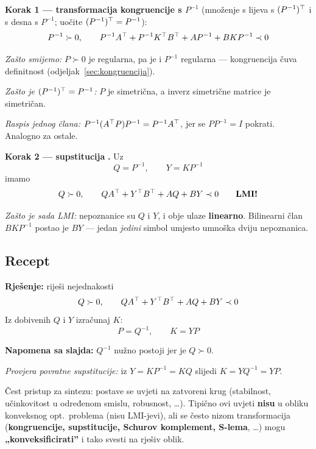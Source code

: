 \textbf{Korak 1 --- transformacija kongruencije s $P^{-1}$} 
(množenje s lijeva s $(P^{-1})^{\top}$ i s desna s $P^{-1}$; uočite
$(P^{-1})^{\top} = P^{-1}$):
\[
P^{-1} \succ 0, \qquad
P^{-1}A^{\top} + P^{-1}K^{\top} B^{\top} + AP^{-1} + BKP^{-1} \prec 0
\]

\emph{Zašto smijemo:} $P \succ 0$ je regularna, pa je i $P^{-1}$ regularna ---
kongruencija čuva definitnost (odjeljak~\ref{sec:kongruencija}).

\emph{Zašto je $(P^{-1})^{\top} = P^{-1}$:} $P$ je simetrična, a inverz simetrične
matrice je simetričan.

\emph{Raspis jednog člana:} $P^{-1}(A^{\top} P)P^{-1} = P^{-1}A^{\top}$, jer se
$PP^{-1} = I$ pokrati. Analogno za ostale.

\textbf{Korak 2 --- supstitucija} \textbf{.} Uz
\[
Q = P^{-1}, \qquad Y = KP^{-1}
\]
imamo
\begin{equation}
\label{eq:sinteza-lmi}
Q \succ 0, \qquad QA^{\top} + Y^{\top} B^{\top} + AQ + BY \prec 0
\qquad \textbf{LMI!}
\end{equation}

\emph{Zašto je sada LMI:} nepoznanice su $Q$ i $Y$, i obje ulaze
\textbf{linearno}. Bilinearni član $BKP^{-1}$ postao je $BY$ --- jedan
\emph{jedini} simbol umjesto umnoška dviju nepoznanica.

\subsection{Recept}

\begin{teorem}
\textbf{Rješenje:} riješi nejednakosti
\[
Q \succ 0, \qquad QA^{\top} + Y^{\top} B^{\top} + AQ + BY \prec 0
\]
Iz dobivenih $Q$ i $Y$ izračunaj $K$:
\[
P = Q^{-1}, \qquad K = YP
\]
\end{teorem}

\textbf{Napomena sa slajda:} $Q^{-1}$ nužno postoji jer je $Q \succ 0$.

\emph{Provjera povratne supstitucije:} iz $Y = KP^{-1} = KQ$ slijedi
$K = YQ^{-1} = YP$. \checkmark

\begin{teorem}
Čest pristup za sintezu: postave se uvjeti na zatvoreni krug (stabilnost,
učinkovitost u određenom smislu, robusnost, \dots). Tipično ovi uvjeti
\textbf{nisu} u obliku konveksnog opt.\ problema (nisu LMI-jevi), ali se često
nizom transformacija (\textbf{kongruencije, supstitucije, Schurov komplement,
S-lema}, \dots) mogu \textbf{„konveksificirati”} i tako svesti na rješiv oblik.
\end{teorem}

